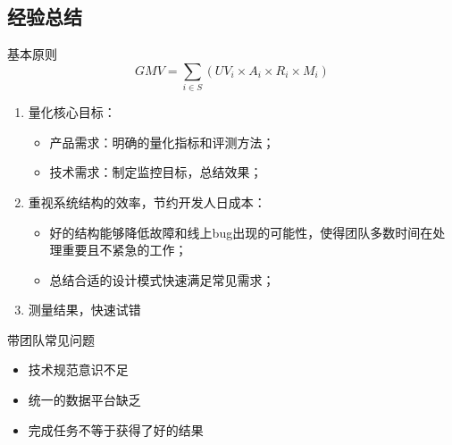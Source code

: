 \documentclass[handout]{beamer}
\begin{document}
\begin{CJK}{UTF8}{gbsn}
\section{经验总结}


\begin{frame}{基本原则}
  $$ GMV = \sum_{i \in S}{(UV_i \times A_i \times R_i \times M_i)} $$
  \begin{enumerate}
  \item {
    量化核心目标：
    \begin{itemize}
    \item { 产品需求：明确的量化指标和评测方法； }
    \item { 技术需求：制定监控目标，总结效果； }
    \end{itemize}
  }
  \item {
    重视系统结构的效率，节约开发人日成本：
    \begin{itemize}
    \item { 好的结构能够降低故障和线上bug出现的可能性，使得团队多数时间在处理重要且不紧急的工作； }
    \item { 总结合适的设计模式快速满足常见需求； }
    \end{itemize}
  }
  \item {
    测量结果，快速试错
  }
  \end{enumerate}
\end{frame}

\begin{frame}{带团队常见问题}
  \begin{itemize}
    \item {技术规范意识不足}
    \item {统一的数据平台缺乏}
    \item {完成任务不等于获得了好的结果}
  \end{itemize}
\end{frame}

\end{CJK}
\end{document}
